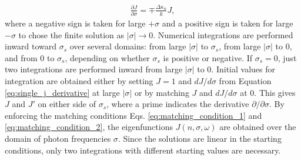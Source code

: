 \documentclass{aastex63}
\newcommand{\be}{\begin{eqnarray}}
\newcommand{\ee}{\end{eqnarray}}
\begin{document}
\be \label{eq:single_j_derivative}
\frac{\partial J}{\partial \sigma} = \mp \frac{\Delta\kappa_n}{k} J,
\ee
where a negative sign is taken for large $+\sigma$ and a positive sign is taken for large $-\sigma$ to chose the finite solution as $|\sigma|\to 0$. Numerical integrations are performed inward toward $\sigma_s$ over several domains: from large $|\sigma|$ to $\sigma_s$, from large $|\sigma|$ to 0, and from 0 to $\sigma_s$, depending on whether $\sigma_s$ is positive or negative. If $\sigma_s=0$, just two integrations are performed inward from large $|\sigma|$ to 0. Initial values for integration are obtained either by setting $J=1$ and $dJ/d\sigma$ from Equation \ref{eq:single_j_derivative} at large $|\sigma|$ or by matching $J$ and $dJ/d\sigma$ at 0. This gives $J$ and $J'$ on either side of $\sigma_s$, where a prime indicates the derivative $\partial/\partial \sigma$. By enforcing the matching conditions Eqs. \ref{eq:matching_condition_1} and \ref{eq:matching_condition_2}, the eigenfunctions $J(n, \sigma, \omega)$ are obtained over the domain of photon frequencies $\sigma$. Since the solutions are linear in the starting conditions, only two integrations with different starting values are necessary.
\end{document}
